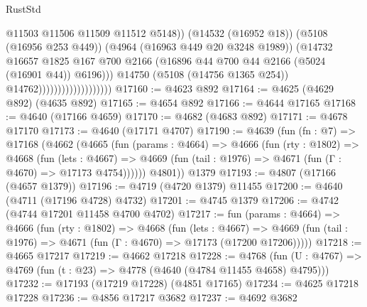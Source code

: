 \begin{lexlean}{RustStd}
\begin{coremodule}
                                                @11503
                                                @11506
                                                @11509
                                                @11512
                                                @5148))
                                            (@14532 (@16952 @18))
                                            (@5108 (@16956 @253 @449))
                                            (@4964 (@16963 @449 @20 @3248 @1989))
                                            (@14732
                                              @16657
                                              @1825
                                              @167
                                              @700
                                              @2166
                                              (@16896
                                                @44
                                                @700
                                                @44
                                                @2166
                                                (@5024 (@16901 @44))
                                                @6196)))
                                          @14750
                                          (@5108 (@14756 @1365 @254))
                                          @14762)))))))))))))))))))
@17160 := @4623 @892
@17164 := @4625 (@4629 @892) (@4635 @892)
@17165 := @4654 @892
@17166 := @4644 @17165
@17168 := @4640 (@17166 @4659)
@17170 := @4682 (@4683 @892)
@17171 := @4678 @17170
@17173 := @4640 (@17171 @4707)
@17190 := @4639
    (fun (fn : @7) =>
    @17168
      (@4662
        (@4665
          (fun (params : @4664) =>
          @4666
            (fun (rty : @1802) =>
            @4668
              (fun (lets : @4667) =>
              @4669 (fun (tail : @1976) => @4671 (fun (Γ : @4670) => @17173 @4754))))))
        @4801))
    @1379
@17193 := @4807 (@17166 (@4657 @1379))
@17196 := @4719 (@4720 @1379) @11455
@17200 := @4640 (@4711 (@17196 @4728) @4732)
@17201 := @4745 @1379
@17206 := @4742 (@4744 @17201 @11458 @4700 @4702)
@17217 := fun (params : @4664) =>
  @4666
    (fun (rty : @1802) =>
    @4668
      (fun (lets : @4667) =>
      @4669 (fun (tail : @1976) => @4671 (fun (Γ : @4670) => @17173 (@17200 @17206)))))
@17218 := @4665 @17217
@17219 := @4662 @17218
@17228 := @4768
    (fun (U : @4767) => @4769 (fun (t : @23) => @4778 (@4640 (@4784 @11455 @4658) @4795)))
@17232 := @17193 (@17219 @17228) (@4851 @17165)
@17234 := @4625 @17218 @17228
@17236 := @4856 @17217 @3682
@17237 := @4692 @3682

\end{coremodule}
\end{lexlean}
